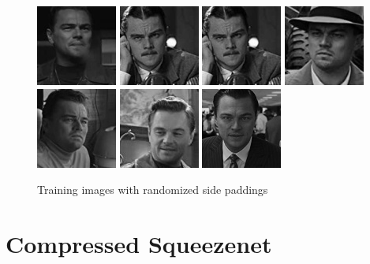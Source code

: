 \begin{figure}[ht!]
    \includegraphics[width = 2 cm]{images/leo/3c5d0190660}\hfill
    \includegraphics[width = 2 cm]{images/leo/3e3f6a53350}\hfill
    \includegraphics[width = 2 cm]{images/leo/3e3f6a53350}\hfill
    \includegraphics[width = 2 cm]{images/leo/3f4b0e0c760}\hfill
    \includegraphics[width = 2 cm]{images/leo/4b605e33360}\hfill
    \includegraphics[width = 2 cm]{images/leo/24eb14f9da0}\hfill
    \includegraphics[width = 2 cm]{images/leo/188d3b34ff1}\hfill
    \caption{Training images with randomized side paddings}
\end{figure}

\section{Compressed Squeezenet}
